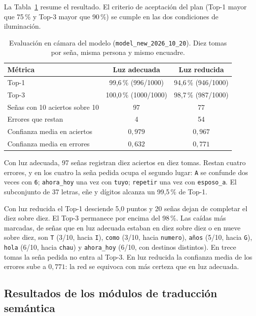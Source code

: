 La Tabla~\ref{tab:eval_100_luz} resume el resultado. El criterio de aceptación del plan (Top-1 mayor que 75\,\% y Top-3 mayor que 90\,\%) se cumple en las dos condiciones de iluminación.

\begin{table}[H]
    \centering
    \small
    \caption{Evaluación en cámara del modelo (\texttt{model\_new\_2026\_10\_20}). Diez tomas por seña, misma persona y mismo encuadre.}
    \label{tab:eval_100_luz}
    \begin{tabular}{lcc}
        \toprule
        \textbf{Métrica} & \textbf{Luz adecuada} & \textbf{Luz reducida} \\
        \midrule
        Top-1 & 99{,}6\,\% (996/1000) & 94{,}6\,\% (946/1000) \\
        Top-3 & 100{,}0\,\% (1000/1000) & 98{,}7\,\% (987/1000) \\
        Señas con 10 aciertos sobre 10 & 97 & 77 \\
        Errores que restan & 4 & 54 \\
        Confianza media en aciertos & $0{,}979$ & $0{,}967$ \\
        Confianza media en errores & $0{,}632$ & $0{,}771$ \\
        \bottomrule
    \end{tabular}
\end{table}

Con luz adecuada, 97 señas registran diez aciertos en diez tomas. Restan cuatro errores, y en los cuatro la seña pedida ocupa el segundo lugar: \texttt{A} se confunde dos veces con \texttt{6}; \texttt{ahora\_hoy} una vez con \texttt{tuyo}; \texttt{repetir} una vez con \texttt{esposo\_a}. El subconjunto de 37 letras, eñe y dígitos alcanza un 99{,}5\,\% de Top-1.

Con luz reducida el Top-1 desciende 5,0 puntos y 20 señas dejan de completar el diez sobre diez. El Top-3 permanece por encima del 98\,\%. Las caídas más marcadas, de señas que en luz adecuada estaban en diez sobre diez o en nueve sobre diez, son \texttt{T} (3/10, hacia \texttt{I}), \texttt{como} (3/10, hacia \texttt{numero}), \texttt{años} (5/10, hacia \texttt{G}), \texttt{hola} (6/10, hacia \texttt{chau}) y \texttt{ahora\_hoy} (6/10, con destinos distintos). En trece tomas la seña pedida no entra al Top-3. En luz reducida la confianza media de los errores sube a $0{,}771$: la red se equivoca con más certeza que en luz adecuada.

\subsection{Resultados de los módulos de traducción semántica}
\label{sec:res_traduccion}

